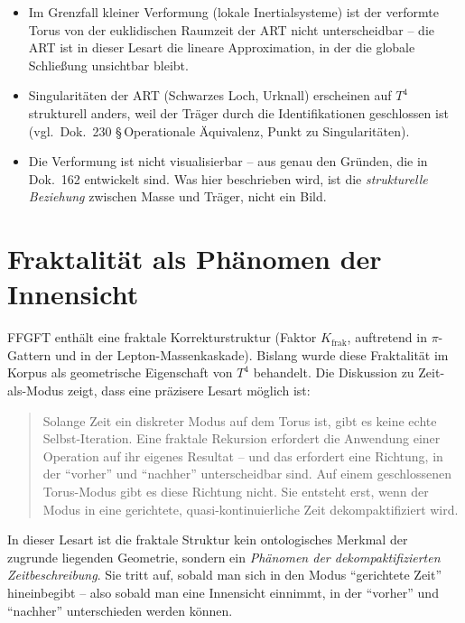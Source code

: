 \begin{itemize}[leftmargin=2em,itemsep=4pt,topsep=4pt]
  \item Im Grenzfall kleiner Verformung (lokale Inertialsysteme) ist
        der verformte Torus von der euklidischen Raumzeit der ART
        nicht unterscheidbar -- die ART ist in dieser Lesart die
        lineare Approximation, in der die globale Schließung
        unsichtbar bleibt.
  \item Singularitäten der ART (Schwarzes Loch, Urknall) erscheinen
        auf $T^4$ strukturell anders, weil der Träger durch die
        Identifikationen geschlossen ist (vgl.\ Dok.~230 §\,Operationale
        Äquivalenz, Punkt zu Singularitäten).
  \item Die Verformung ist nicht visualisierbar -- aus genau den
        Gründen, die in Dok.~162 entwickelt sind. Was hier beschrieben
        wird, ist die \emph{strukturelle Beziehung} zwischen Masse und
        Träger, nicht ein Bild.
\end{itemize}

\section{Fraktalität als Phänomen der Innensicht}

FFGFT enthält eine fraktale Korrekturstruktur (Faktor $K_{\text{frak}}$,
auftretend in $\pi$-Gattern und in der Lepton-Massenkaskade). Bislang
wurde diese Fraktalität im Korpus als geometrische Eigenschaft von
$T^4$ behandelt. Die Diskussion zu Zeit-als-Modus zeigt, dass eine
präzisere Lesart möglich ist:

\begin{quote}
Solange Zeit ein diskreter Modus auf dem Torus ist, gibt es keine
echte Selbst-Iteration. Eine fraktale Rekursion erfordert die
Anwendung einer Operation auf ihr eigenes Resultat -- und das
erfordert eine Richtung, in der \enquote{vorher} und \enquote{nachher}
unterscheidbar sind. Auf einem geschlossenen Torus-Modus gibt es
diese Richtung nicht. Sie entsteht erst, wenn der Modus in eine
gerichtete, quasi-kontinuierliche Zeit dekompaktifiziert wird.
\end{quote}

In dieser Lesart ist die fraktale Struktur kein ontologisches Merkmal
der zugrunde liegenden Geometrie, sondern ein \emph{Phänomen der
dekompaktifizierten Zeitbeschreibung}. Sie tritt auf, sobald man sich
in den Modus \enquote{gerichtete Zeit} hineinbegibt -- also sobald
man eine Innensicht einnimmt, in der \enquote{vorher} und
\enquote{nachher} unterschieden werden können.

